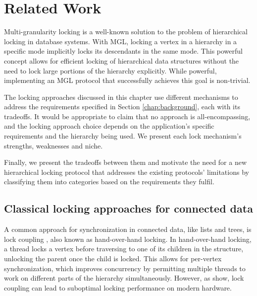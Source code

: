 \chapter{Related Work} \label{chap:relatedwork}

\minitoc

Multi-granularity locking is a well-known solution to the problem of hierarchical locking in database systems. 
With MGL, locking a vertex in a hierarchy in a specific mode implicitly locks its descendants in the same mode. 
This powerful concept allows for efficient locking of hierarchical data structures without the need to lock large portions of the hierarchy explicitly.
While powerful, implementing an MGL protocol that successfully achieves this goal is non-trivial. 


The locking approaches discussed in this chapter use different mechanisms to address the requirements specified in Section \ref{chap:background}, each with its tradeoffs. 
It would be appropriate to claim that no approach is all-encompassing, and the locking approach choice depends on the application's specific requirements and the hierarchy being used. We present each lock mechanism's strengths, weaknesses and niche.

Finally, we present the tradeoffs between them and motivate the need for a new hierarchical locking protocol that addresses the existing protocols' limitations by classifying them into categories based on the requirements they fulfil.


\section{Classical locking approaches for connected data}

A common approach for synchronization in connected data, like lists and trees, is lock coupling \cite{DBLP:journals/acta/BayerS77}, also known as hand-over-hand locking. In hand-over-hand locking, a thread locks a vertex before traversing to one of its children in the structure, unlocking the parent once the child is locked. 
This allows for per-vertex synchronization, which improves concurrency by permitting multiple threads to work on different parts of the hierarchy simultaneously. 
However, as \citet{LeisH019} show, lock coupling can lead to suboptimal locking performance on modern hardware.


